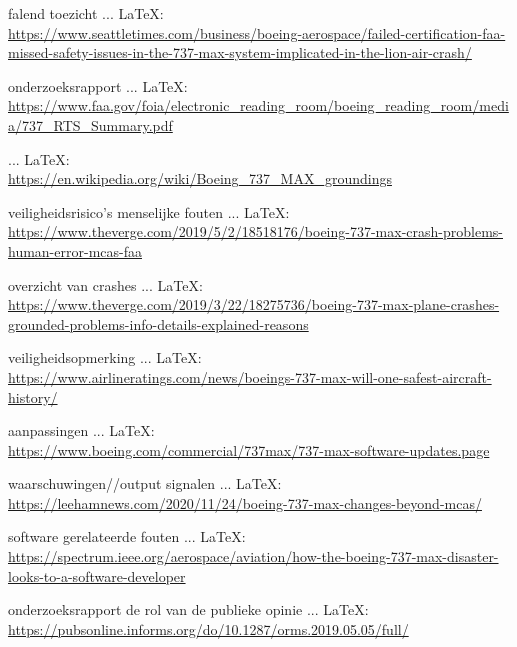 \begin{thebibliography}{99}
{{{{{{{    falend toezicht
     ... \LaTeX:\\ \url{https://www.seattletimes.com/business/boeing-aerospace/failed-certification-faa-missed-safety-issues-in-the-737-max-system-implicated-in-the-lion-air-crash/}
    
    onderzoeksrapport
     ... \LaTeX:\\ \url{https://www.faa.gov/foia/electronic_reading_room/boeing_reading_room/media/737_RTS_Summary.pdf}
    
     ... \LaTeX:\\ \url{https://en.wikipedia.org/wiki/Boeing_737_MAX_groundings}
    
    veiligheidsrisico's
    menselijke fouten
     ... \LaTeX:\\ \url{https://www.theverge.com/2019/5/2/18518176/boeing-737-max-crash-problems-human-error-mcas-faa}
    
    overzicht van crashes
     ... \LaTeX:\\ \url{https://www.theverge.com/2019/3/22/18275736/boeing-737-max-plane-crashes-grounded-problems-info-details-explained-reasons}
    
    veiligheidsopmerking
     ... \LaTeX:\\ \url{https://www.airlineratings.com/news/boeings-737-max-will-one-safest-aircraft-history/}
    
    aanpassingen
     ... \LaTeX:\\ \url{https://www.boeing.com/commercial/737max/737-max-software-updates.page}
    
    waarschuwingen//output signalen
     ... \LaTeX:\\ \url{https://leehamnews.com/2020/11/24/boeing-737-max-changes-beyond-mcas/}
    
    software gerelateerde fouten
     ... \LaTeX:\\ \url{https://spectrum.ieee.org/aerospace/aviation/how-the-boeing-737-max-disaster-looks-to-a-software-developer}
    
    onderzoeksrapport
    de rol van de publieke opinie
     ... \LaTeX:\\ \url{https://pubsonline.informs.org/do/10.1287/orms.2019.05.05/full/}
    
}}}}}}}
\end{thebibliography}
